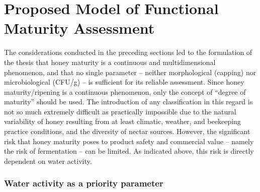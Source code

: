 
\section{Proposed Model of Functional Maturity Assessment}

The considerations conducted in the preceding sections led to
the formulation of the thesis that honey maturity is a continuous
and multidimensional phenomenon, and that no single parameter --
neither morphological (capping) nor microbiological (CFU/g) --
is sufficient for its reliable assessment.
Since honey maturity/ripening is a continuous phenomenon, only the
concept of ``degree of maturity'' should be used. The introduction
of any classification in this regard is not so much extremely
difficult as practically impossible due to the natural variability
of honey resulting from at least climatic, weather, and beekeeping
practice conditions, and the diversity of nectar sources. However,
the significant risk that honey maturity poses to product safety
and commercial value -- namely the risk of fermentation -- can be
limited. As indicated above, this risk is directly dependent on
water activity.



\subsubsection{Water activity as a priority parameter}

